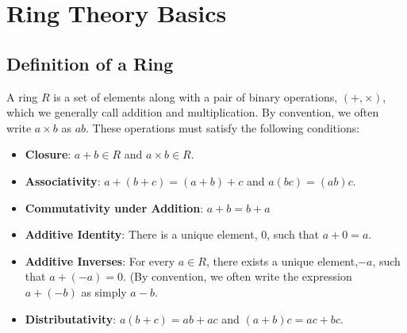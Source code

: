 \documentclass[twoside]{report}
\begin{document}


\newcommand{\poly}[1]{#1[x]}
\newcommand{\polyn}[1]{#1[x_1, x_2,\cdots,x_n]}
\newcommand{\ideal}[1]{\langle#1\rangle}
\newcommand{\varideal}[1]{\mathcal{I}(#1)}
\newcommand{\variety}[1]{\mathbf{V}(#1)}

\addtocounter{chapter}{1}

\section{Ring Theory Basics}

\setlength{\parindent}{0pt}

\subsection{Definition of a Ring}

A ring $R$ is a set of elements along with a pair of binary
operations, $(+, \times)$, which we generally call addition and
multiplication.  By convention, we often write $a \times b$ as $ab$.
These operations must satisfy the following conditions:

\begin{itemize}
\item \textbf{Closure}: $a+b \in R$ and $a \times b \in R$.
\item \textbf{Associativity}: $a+(b+c)=(a+b)+c$ and $a(bc) = (ab)c$.
\item \textbf{Commutativity under Addition}: $a+b = b+a$
\item \textbf{Additive Identity}: There is a unique element, $0$, such that $a+0=a$.
\item \textbf{Additive Inverses}: For every $a \in R$, there exists a
  unique element,$-a$, such that $a + (-a) = 0$. (By convention, we
  often write the expression $a + (-b)$ as simply $a-b$.
\item \textbf{Distributativity}: $a(b+c) = ab + ac$ and $(a+b)c = ac
  + bc$.
\end{itemize}
\end{document}
